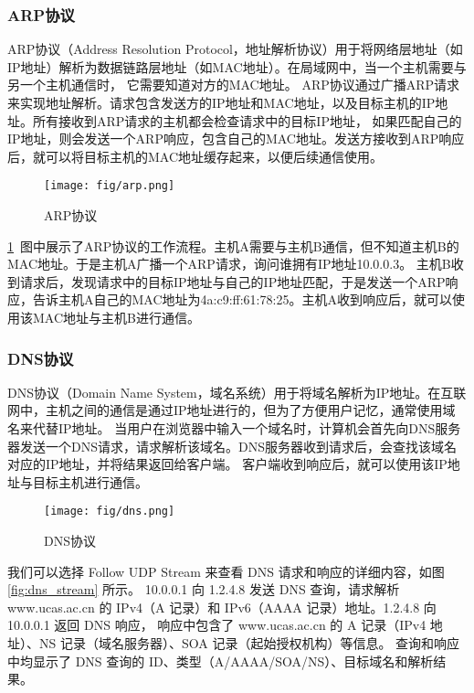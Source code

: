 \documentclass[11pt]{article}
\begin{document}
\subsubsection{ARP协议}
ARP协议（Address Resolution Protocol，地址解析协议）用于将网络层地址（如IP地址）解析为数据链路层地址（如MAC地址）。在局域网中，当一个主机需要与另一个主机通信时，
它需要知道对方的MAC地址。 ARP协议通过广播ARP请求来实现地址解析。请求包含发送方的IP地址和MAC地址，以及目标主机的IP地址。所有接收到ARP请求的主机都会检查请求中的目标IP地址，
如果匹配自己的IP地址，则会发送一个ARP响应，包含自己的MAC地址。发送方接收到ARP响应后，就可以将目标主机的MAC地址缓存起来，以便后续通信使用。

\begin{figure}[H]
  \centering
  \texttt{[image: fig/arp.png]}
  \caption{ARP协议}
  \label{fig:arp}
\end{figure}

\ref{fig:arp}\, 图中展示了ARP协议的工作流程。主机A需要与主机B通信，但不知道主机B的MAC地址。于是主机A广播一个ARP请求，询问谁拥有IP地址10.0.0.3。
主机B收到请求后，发现请求中的目标IP地址与自己的IP地址匹配，于是发送一个ARP响应，告诉主机A自己的MAC地址为4a:c9:ff:61:78:25。主机A收到响应后，就可以使用该MAC地址与主机B进行通信。

\subsubsection{DNS协议}
DNS协议（Domain Name System，域名系统）用于将域名解析为IP地址。在互联网中，主机之间的通信是通过IP地址进行的，但为了方便用户记忆，通常使用域名来代替IP地址。
当用户在浏览器中输入一个域名时，计算机会首先向DNS服务器发送一个DNS请求，请求解析该域名。DNS服务器收到请求后，会查找该域名对应的IP地址，并将结果返回给客户端。
客户端收到响应后，就可以使用该IP地址与目标主机进行通信。

\begin{figure}[H]
  \centering
  \texttt{[image: fig/dns.png]}
  \caption{DNS协议}
  \label{fig:dns}
\end{figure}

我们可以选择 Follow UDP Stream 来查看 DNS 请求和响应的详细内容，如图 \ref{fig:dns_stream} 所示。
10.0.0.1 向 1.2.4.8 发送 DNS 查询，请求解析 www.ucas.ac.cn 的 IPv4（A 记录）和 IPv6（AAAA 记录）地址。1.2.4.8 向 10.0.0.1 返回 DNS 响应，
响应中包含了 www.ucas.ac.cn 的 A 记录（IPv4 地址）、NS 记录（域名服务器）、SOA 记录（起始授权机构）等信息。
查询和响应中均显示了 DNS 查询的 ID、类型（A/AAAA/SOA/NS）、目标域名和解析结果。
\end{document}
